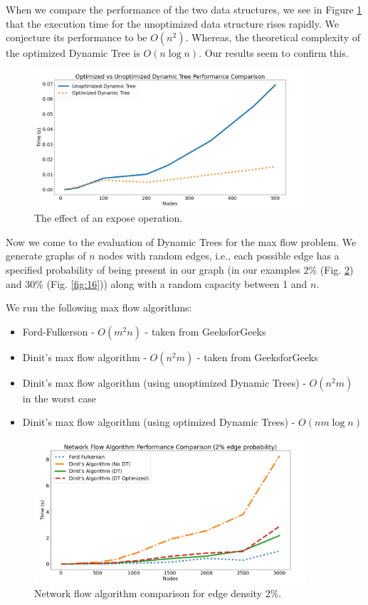 \documentclass[a4paper, 11pt]{article}
\begin{document}
When we compare the performance of the two data structures, we see in Figure \ref{fig:14} that the execution time for the unoptimized data structure rises rapidly. We conjecture its performance to be \(O(n^2)\). Whereas, the theoretical complexity of the optimized Dynamic Tree is \(O(n \log n)\). Our results seem to confirm this.

\begin{figure}[H]
    \centering
    \includegraphics[width=0.9\textwidth]{img/analysis/optim-result.png}
    \caption{The effect of an expose operation.}
    \label{fig:14}
\end{figure}

Now we come to the evaluation of Dynamic Trees for the max flow problem. We generate graphs of \(n\) nodes with random edges, i.e., each possible edge has a specified probability of being present in our graph (in our examples 2\% (Fig. \ref{fig:15}) and 30\% (Fig. \ref{fig:16})) along with a random capacity between 1 and \(n\).

We run the following max flow algorithms:
\begin{itemize}
    \item Ford-Fulkerson - \(O(m^2n)\) - taken from GeeksforGeeks \cite{gg_ff}
    \item Dinit’s max flow algorithm - \(O(n^2m)\) - taken from GeeksforGeeks \cite{gg_dinit}
    \item Dinit’s max flow algorithm (using unoptimized Dynamic Trees) - \(O(n^2m)\) in the worst case
    \item Dinit’s max flow algorithm (using optimized Dynamic Trees) - \(O(nm \log n)\)
\end{itemize}

\begin{figure}[H]
    \centering
    \includegraphics[width=0.9\textwidth]{img/analysis/2-result.png}
    \caption{Network flow algorithm comparison for edge density 2\%.}
    \label{fig:15}
\end{figure}
\end{document}
